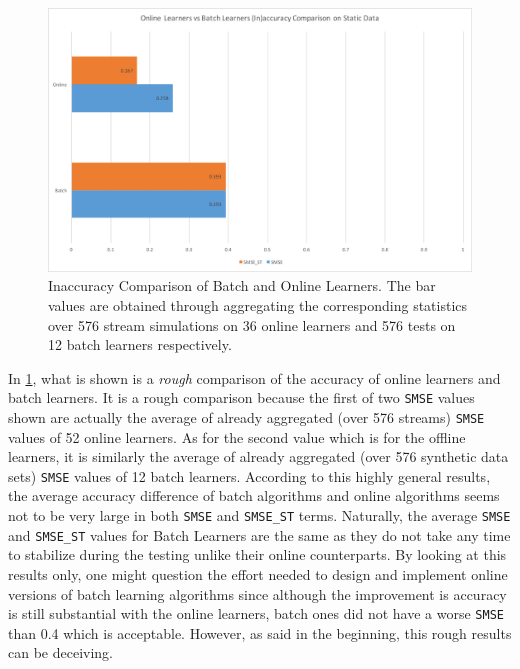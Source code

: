 \begin{figure}[htbp]
  \centering
    \includegraphics[width=\linewidth]{./Figures/batch_vs_online_inaccuracy_comp1.pdf}
  \caption{Inaccuracy Comparison of Batch and Online Learners. The bar values are obtained through aggregating the corresponding statistics over 576 stream simulations on 36 online learners and 576 tests on 12 batch learners respectively.}
  \label{fig:batch_vs_online_inaccuracy_comp1}
\end{figure}

In \ref{fig:batch_vs_online_inaccuracy_comp1}, what is shown is a \textit{rough} comparison of the accuracy of online learners and batch learners. It is a rough comparison because the first of two \texttt{SMSE} values shown are actually the average of already aggregated (over 576 streams) \texttt{SMSE} values of 52 online learners. As for the second value which is for the offline learners, it is similarly the average of already aggregated (over 576 synthetic data sets) \texttt{SMSE} values of 12 batch learners. According to this highly general results, the average accuracy difference of batch algorithms and online algorithms seems not to be very large in both \texttt{SMSE} and \texttt{SMSE\_ST} terms. Naturally, the average \texttt{SMSE} and \texttt{SMSE\_ST} values for Batch Learners are the same as they do not take any time to stabilize during the testing unlike their online counterparts. By looking at this results only, one might question the effort needed to design and implement online versions of batch learning algorithms since although the improvement is accuracy is still substantial with the online learners, batch ones did not have a worse \texttt{SMSE} than 0.4 which is acceptable. However, as said in the beginning, this rough results can be deceiving.

